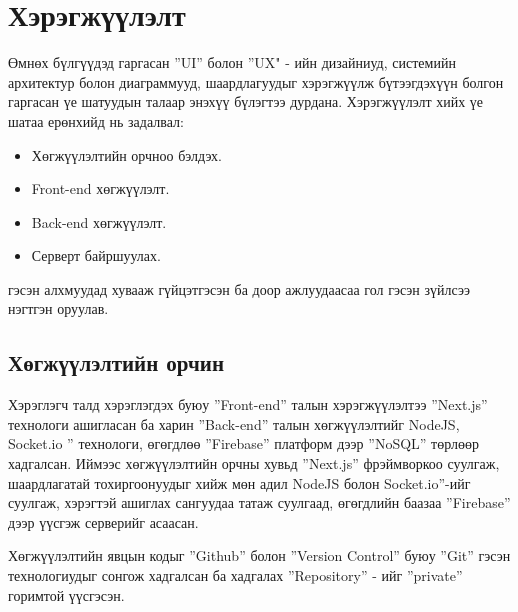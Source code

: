 \chapter{Хэрэгжүүлэлт}

Өмнөх бүлгүүдэд гаргасан ”UI”  болон ”UX" - ийн дизайниуд, системийн архитектур болон диаграммууд, шаардлагуудыг хэрэгжүүлж бүтээгдэхүүн болгон гаргасан үе шатуудын талаар энэхүү бүлэгтээ дурдана.
Хэрэгжүүлэлт хийх үе шатаа ерөнхийд нь задалвал:

\begin{itemize}
	\item Хөгжүүлэлтийн орчноо бэлдэх.
	\item Front-end хөгжүүлэлт.
	\item Back-end хөгжүүлэлт.
	\item Серверт байршуулах.
\end{itemize}

гэсэн алхмуудад хувааж гүйцэтгэсэн ба доор ажлуудаасаа гол гэсэн зүйлсээ нэгтгэн оруулав.

\section{Хөгжүүлэлтийн орчин}

Хэрэглэгч талд хэрэглэгдэх буюу ”Front-end” талын хэрэгжүүлэлтээ ”Next.js” технологи ашигласан ба харин ”Back-end” талын хөгжүүлэлтийг NodeJS, Socket.io ” технологи, өгөгдлөө ”Firebase” платформ дээр ”NoSQL” төрлөөр хадгалсан. Иймээс хөгжүүлэлтийн орчны хувьд ”Next.js” фрэймворкоо суулгаж, шаардлагатай тохиргоонуудыг хийж мөн адил NodeJS болон Socket.io”-ийг суулгаж, хэрэгтэй ашиглах сангуудаа татаж суулгаад, өгөгдлийн баазаа ”Firebase” дээр үүсгэж серверийг асаасан.

Хөгжүүлэлтийн явцын кодыг ”Github” болон ”Version Control” буюу ”Git” гэсэн технологиудыг сонгож хадгалсан ба хадгалах ”Repository” - ийг ”private” горимтой үүсгэсэн.

